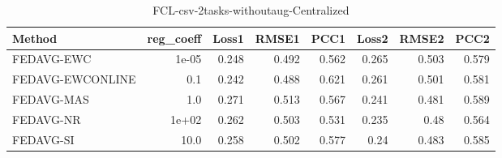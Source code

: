 \begin{table}
\caption{FCL-csv-2tasks-withoutaug-Centralized}
\begin{tabular}{lrrrrrrr}
\toprule
Method & reg_coeff & Loss1 & RMSE1 & PCC1 & Loss2 & RMSE2 & PCC2 \\
\midrule
FEDAVG-EWC & 1e-05 & 0.248 & 0.492 & 0.562 & 0.265 & 0.503 & 0.579 \\
FEDAVG-EWCONLINE & 0.1 & 0.242 & 0.488 & 0.621 & 0.261 & 0.501 & 0.581 \\
FEDAVG-MAS & 1.0 & 0.271 & 0.513 & 0.567 & 0.241 & 0.481 & 0.589 \\
FEDAVG-NR & 1e+02 & 0.262 & 0.503 & 0.531 & 0.235 & 0.48 & 0.564 \\
FEDAVG-SI & 10.0 & 0.258 & 0.502 & 0.577 & 0.24 & 0.483 & 0.585 \\
\bottomrule
\end{tabular}
\end{table}
